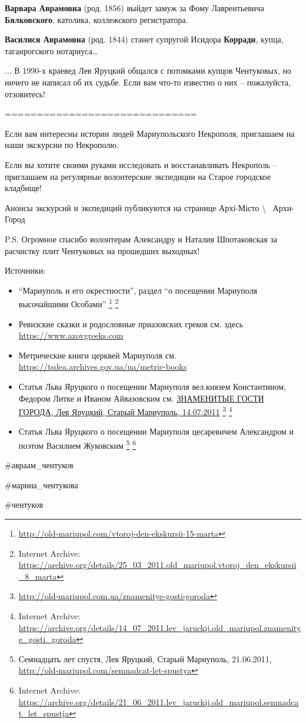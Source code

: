 \textbf{Варвара Аврамовна} (род. 1856) выйдет замуж за Фому Лаврентьевича \textbf{Бялковского},
католика, коллежского регистратора.

\textbf{Василися Аврамовна} (род. 1844) станет супругой Исидора
\textbf{Корради}, купца, таганрогского нотариуса…

... В 1990-х краевед Лев Яруцкий общался с потомками купцов Чентуковых, но ничего
не написал об их судьбе. Если вам что-то известно о них – пожалуйста,
отзовитесь!

==============================

Если вам интересны истории людей Мариупольского Некрополя, приглашаем на наши
экскурсии по Некрополю.

Если вы хотите своими руками исследовать и восстанавливать Некрополь –
приглашаем на регулярные волонтерские экспедиции на Старое городское кладбище!

Анонсы экскурсий и экспедиций публикуются на странице Архі-Місто
\textbackslash~ Архи-Город

P.S. Огромное спасибо волонтерам Александру и Наталия Шпотаковская за расчистку
плит Чентуковых на прошедших выходных!

Источники:

\begin{itemize} %
\item \enquote{Мариуполь и его окрестности}, раздел \enquote{о посещении Мариуполя высочайшими Особами}
				\footnote{\url{http://old-mariupol.com/vtoroj-den-ekskursii-15-marta}}
				\footnote{Internet Archive: \url{https://archive.org/details/25_03_2011.old_mariupol.vtoroj_den_ekskursii_8_marta}}
\item Ревизские сказки и родословные приазовских греков см. здесь \url{https://www.azovgreeks.com}
\item Метрические книги церквей Мариуполя см. \url{https://tsdea.archives.gov.ua/ua/metric-books}
\item Статья Льва Яруцкого о посещении Мариуполя вел.князем Константином, Федором Литке и Иваном Айвазовским см. 
\href{https://archive.org/details/14_07_2011.lev_jaruckij.old_mariupol.znamenitye_gosti_goroda}{%
				ЗНАМЕНИТЫЕ ГОСТИ ГОРОДА, Лев Яруцкий, Старый Мариуполь, 14.07.2011}
\footnote{\url{http://old-mariupol.com.ua/znamenitye-gosti-goroda}}
\footnote{Internet Archive: \url{https://archive.org/details/14_07_2011.lev_jaruckij.old_mariupol.znamenitye_gosti_goroda}}

\item Статья Льва Яруцкого о посещении Мариуполя цесаревичем Александром и поэтом Василием Жуковским 
\footnote{Семнадцать лет спустя, Лев Яруцкий, Старый Мариуполь, 21.06.2011, \url{http://old-mariupol.com/semnadcat-let-spustya}} %
\footnote{Internet Archive: \url{https://archive.org/details/21_06_2011.lev_jaruckij.old_mariupol.semnadcat_let_spustja}}
\end{itemize} %

\#авраам\_чентуков

\#марина\_чентукова

\#чентуков
